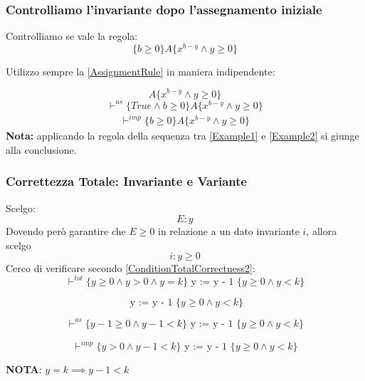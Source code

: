 \begin{esempio}
				      \subsubsection{Controlliamo l'invariante dopo l'assegnamento iniziale}
                        Controlliamo se vale la regola:
                         \[\{b \geq 0\}A\{x^{b-y} \land y \geq 0\}\]
                         
                         Utilizzo sempre la \ref{AssignmentRule} in maniera indipendente:
                        
                        \[A\{x^{b-y} \land y \geq 0\}\]
 				        \[\vdash^{as}\{ True \land b \geq 0 \} A \{ x^{b-y} \land y \geq 0\}\]
 				        \begin{align}
      				        \vdash^{imp}\{b \geq 0 \}A\{x^{b-y} \land y \geq 0\}
      				        \label{Example2}
 				        \end{align}
				      \textbf{Nota:} applicando la regola della sequenza tra \ref{Example1} e \ref{Example2} si giunge alla conclusione.
                    \subsubsection{Correttezza Totale: Invariante e Variante}
                    Scelgo:
                    \[E: y\]
			      Dovendo però garantire che $E\geq 0$ in relazione a un dato invariante $i$, allora scelgo
			      \[i: y \geq 0\] 
			      Cerco di verificare secondo \ref{ConditionTotalCorrectness2}:
			      \[\vdash^{tot}\{y \geq 0 \land y > 0 \land y=k\}\mbox{ y := y - 1 }\{y \geq 0\land y<k\}\]
			      
			      \[\mbox{ y := y - 1 }\{y \geq 0\land y < k\}\]

			      \[\vdash^{as}\{y - 1 \geq 0\land y-1 < k\}\mbox{ y := y - 1 }\{y \geq 0\land y<k\}\]
			      
			      \[\vdash^{imp}\{y > 0 \land y-1 < k\}\mbox{ y := y - 1 }\{y \geq 0\land y<k\}\]
			      
			      \textbf{NOTA}: $y = k \implies y - 1 < k$

				    \end{esempio}   
				     
				     
